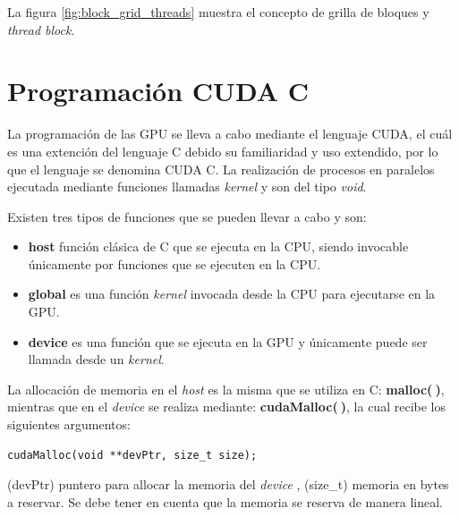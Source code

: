 La figura \ref{fig:block_grid_threads} muestra el concepto de grilla de bloques y \textit{thread block}.

\section{Programación CUDA C}

La programación de las GPU se lleva a cabo mediante el lenguaje CUDA, el cuál es una extención del lenguaje C debido su familiaridad y uso extendido, por lo que el lenguaje se denomina CUDA C. La realización de procesos en paralelos ejecutada mediante funciones llamadas \textit{kernel} y son del tipo \textit{void}.

Existen tres tipos de funciones que se pueden llevar a cabo y son:

\begin{itemize}
	
	\item \textbf{host} función clásica de C que se ejecuta en la CPU, siendo invocable únicamente por funciones que se ejecuten en la CPU. 

	\item \textbf{global} es una función \textit{kernel} invocada desde la CPU para ejecutarse en la GPU. 
	
	\item \textbf{device} es una función que se ejecuta en la GPU y únicamente puede ser llamada desde un \textit{kernel}.
	
\end{itemize}

La allocación de memoria en el \textit{host} es la misma que se utiliza en C: \textbf{malloc($\>$)}, mientras que en el \textit{device} se realiza mediante: \textbf{cudaMalloc($\>$)}, la cual recibe los siguientes argumentos:
{\footnotesize
\begin{frame}{}
	\begin{lstlisting}
cudaMalloc(void **devPtr, size_t size);
	\end{lstlisting}

\end{frame}
}
(devPtr) puntero para allocar la memoria del \textit{device} , (size\_t) memoria en bytes a reservar. Se debe tener en cuenta que la memoria se reserva de manera lineal.

